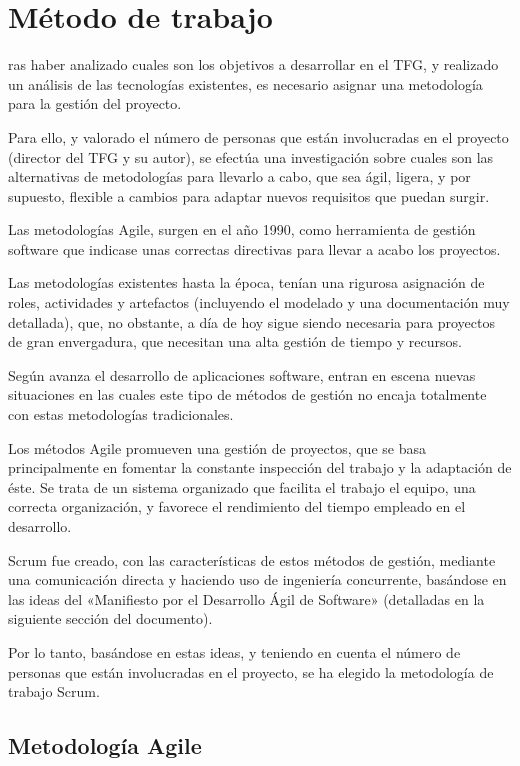 \chapter{Método de trabajo}
\label{chap:metodo}
ras haber analizado cuales son los objetivos a desarrollar en el TFG, y realizado un análisis de las tecnologías existentes, es necesario asignar una metodología para la gestión del proyecto. 

Para ello, y valorado el número de personas que están involucradas en el proyecto (director del TFG y su autor), se efectúa una investigación sobre cuales son las alternativas de metodologías para llevarlo a cabo, que sea ágil, ligera, y por supuesto, flexible a cambios para adaptar nuevos requisitos que puedan surgir.

Las metodologías Agile, surgen en el año 1990, como herramienta de gestión software que indicase unas correctas directivas para llevar a acabo los proyectos. 

Las metodologías existentes hasta la época, tenían una rigurosa asignación de roles, actividades y artefactos (incluyendo el modelado y una documentación muy detallada), que, no obstante, a día de hoy sigue siendo necesaria para proyectos de gran envergadura, que necesitan una alta gestión de tiempo y recursos. 

Según avanza el desarrollo de aplicaciones software, entran en escena nuevas situaciones en las cuales este tipo de métodos de gestión no encaja totalmente con estas metodologías tradicionales. 

Los métodos Agile promueven una gestión de proyectos, que se basa principalmente en fomentar la constante inspección del trabajo y la adaptación de éste. Se trata de un sistema organizado que facilita el trabajo el equipo, una correcta organización, y favorece el rendimiento del tiempo empleado en el desarrollo.

Scrum fue creado, con las características de estos métodos de gestión, mediante una comunicación directa y haciendo uso de ingeniería concurrente, basándose en las ideas del «Manifiesto por el Desarrollo Ágil de Software» (detalladas en la siguiente sección del documento).

Por lo tanto, basándose en estas ideas, y teniendo en cuenta el número de personas que están involucradas en el proyecto, se ha elegido la metodología de trabajo Scrum.


\section{Metodología Agile}



